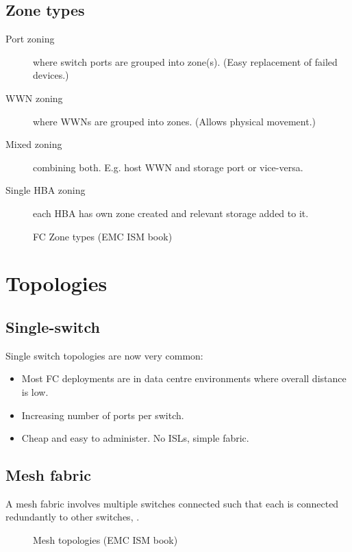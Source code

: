 \subsection{Zone types}\label{zone-types}

\begin{description}
\item[Port zoning]
where switch ports are grouped into zone(s). (Easy replacement of failed
devices.)
\item[WWN zoning]
where WWNs are grouped into zones. (Allows physical movement.)
\item[Mixed zoning]
combining both. E.g. host WWN and storage port or vice-versa.
\item[Single HBA zoning]
each HBA has own zone created and relevant storage added to it.
\end{description}

\begin{figure}
\centering
\caption{FC Zone types (EMC ISM book){}}
\end{figure}

\section{Topologies}\label{topologies}

\subsection{Single-switch}\label{single-switch}

Single switch topologies are now very common:

\begin{itemize}
\item
  Most FC deployments are in data centre environments where overall
  distance is low.
\item
  Increasing number of ports per switch.
\item
  Cheap and easy to administer. No ISLs, simple fabric.
\end{itemize}

\subsection{Mesh fabric}\label{mesh-fabric}

A mesh fabric involves multiple switches connected such that each is
connected redundantly to other switches, .

\begin{figure}
\centering
\caption{Mesh topologies (EMC ISM book){}}
\end{figure}

